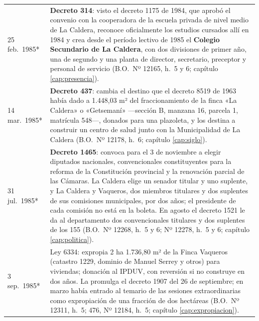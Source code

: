 \begin{longtable}{@{}p{2.7cm}p{10.3cm}@{}}
25 feb.\ 1985* & \textbf{Decreto 314}: visto el decreto 1175 de 1984, que aprobó el convenio con la cooperadora de la escuela privada de nivel medio de La Caldera, reconoce oficialmente los estudios cursados allí en 1984 y crea desde el período lectivo de 1985 el \textbf{Colegio Secundario de La Caldera}, con dos divisiones de primer año, una de segundo y una planta de director, secretario, preceptor y personal de servicio (B.O.\ Nº 12165, h.\ 5 y 6; capítulo \ref{cap:presencia}). \\
14 mar.\ 1985* & \textbf{Decreto 437}: cambia el destino que el decreto 8519 de 1963 había dado a 1.448,03 m² del fraccionamiento de la finca «La Caldera» o «Getsemaní» ---sección B, manzana 16, parcela 1, matrícula 548---, donados para una plazoleta, y los destina a construir un centro de salud junto con la Municipalidad de La Caldera (B.O.\ Nº 12178, h.\ 6; capítulo \ref{cap:siglo}). \\
31 jul.\ 1985* & \textbf{Decreto 1465}: convoca para el 3 de noviembre a elegir diputados nacionales, convencionales constituyentes para la reforma de la Constitución provincial y la renovación parcial de las Cámaras. La Caldera elige un senador titular y uno suplente, y La Caldera y Vaqueros, dos miembros titulares y dos suplentes de sus comisiones municipales, por dos años; el presidente de cada comisión no está en la boleta. En agosto el decreto 1521 le da al departamento dos convencionales titulares y dos suplentes de los 155 (B.O.\ Nº 12268, h.\ 5 y 6; Nº 12278, h.\ 5 y 6; capítulo \ref{cap:politica}). \\
3 sep.\ 1985* & Ley 6334: expropia 2 ha 1.736,80 m² de la Finca Vaqueros (catastro 1229, dominio de Manuel Serrey y otros) para viviendas; donación al IPDUV, con reversión si no construye en dos años. La promulga el decreto 1907 del 26 de septiembre; en marzo había entrado al temario de las sesiones extraordinarias como expropiación de una fracción de dos hectáreas (B.O.\ Nº 12311, h.\ 5; 476, Nº 12184, h.\ 5; capítulo \ref{cap:expropiacion}). \\

\end{longtable}
